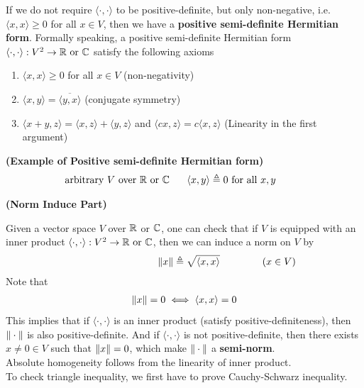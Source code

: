 \documentclass{report}
\begin{document}
\begin{mdframed}
If we do not require $\langle \cdot,\cdot\rangle $ to be positive-definite, but only non-negative, i.e. $\langle x,x\rangle \geq 0$ for all $x\in V$, then we have a \textbf{positive semi-definite Hermitian form}. Formally speaking, a positive semi-definite Hermitian form $\langle\cdot,\cdot \rangle :V^2 \rightarrow \mathbb{R}\text{ or }\mathbb{C}$ satisfy the following axioms
\begin{enumerate}[label=(\alph*)]
  \item $\langle x,x\rangle \geq 0$ for all $x\in V$ (non-negativity)
  \item $\langle x,y\rangle =\overline{\langle y,x\rangle }$ (conjugate symmetry)
  \item $\langle x+y,z\rangle =\langle x,z\rangle +\langle y,z\rangle $ and $\langle cx,z\rangle=c\langle x,z\rangle $ (Linearity in the first argument)
\end{enumerate}
\begin{Example}{\textbf{(Example of Positive semi-definite Hermitian form)}}{}
\begin{align*}
\text{ arbitrary }V\text{ over $\mathbb{R}$ or  $\mathbb{C}$ }\hspace{0.5cm}\langle x,y\rangle \triangleq 0\text{ for all $x,y$ }\hspace{1cm}
\end{align*}
\end{Example}
\end{mdframed}
\textbf{(Norm Induce Part)}
\begin{mdframed}
Given a vector space $V$ over $\mathbb{R}$ or  $\mathbb{C}$, one can check that if  $V$ is equipped with an inner product  $\langle \cdot,\cdot\rangle :V^2\rightarrow \mathbb{R}\text{ or }\mathbb{C}$, then we can induce a norm on $V$ by 
\begin{align*}
\hspace{3cm}\norm{x}\triangleq \sqrt{\langle x,x\rangle }\hspace{1.5cm}(x \in V)
\end{align*}
Note that 
\begin{align*}
\| x \|=0\iff \langle x,x\rangle =0 
\end{align*}
This implies that if $\langle \cdot,\cdot\rangle $ is an inner product (satisfy positive-definiteness), then $\| \cdot \|$ is also positive-definite. And if $\langle \cdot,\cdot\rangle $ is not positive-definite, then there exists  $x\neq 0\in V$ such that $\| x \|=0$, which make $\| \cdot \|$ a \textbf{semi-norm}.\\

Absolute homogeneity follows from the linearity of inner product.\\

To check triangle inequality, we first have to prove Cauchy-Schwarz inequality.
\end{mdframed}
\end{document}
